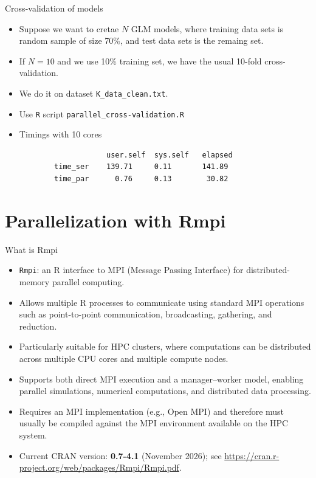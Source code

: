 \documentclass[compress,xcolor=table]{beamer}
\begin{document}
\begin{frame}[fragile]{Cross-validation of models}
\begin{itemize}
	\item 	Suppose we want to cretae $N$ GLM models, where training data sets is random sample of size 70\%, and test data sets is the remaing set. 
	\item If $N=10$ and we use 10\% training set, we have the usual 10-fold cross-validation.
	\item We do it on dataset {\tt K\_data\_clean.txt}.
	\item Use {\tt R} script {\tt parallel\_cross-validation.R}
	\item Timings with 10 cores
		\begin{verbatim}
		            user.self  sys.self   elapsed
        time_ser    139.71     0.11       141.89    
        time_par      0.76     0.13        30.82    
 \end{verbatim}
\end{itemize}
\end{frame}

%

	
	
\section{Parallelization with Rmpi}
%




	
	\begin{frame}[fragile]{What  is Rmpi}
\begin{itemize} \footnotesize
	\item \texttt{Rmpi}: an R interface to MPI (Message Passing Interface) for distributed-memory parallel computing. 
	\item Allows multiple R processes to communicate using standard MPI operations such as point-to-point communication, broadcasting, gathering, and reduction. \item Particularly suitable for HPC clusters, where computations can be distributed across multiple CPU cores and multiple compute nodes. 
	\item Supports both direct MPI execution and a manager--worker model, enabling parallel simulations, numerical computations, and distributed data processing. \item Requires an MPI implementation (e.g., Open MPI) and therefore must usually be compiled against the MPI environment available on the HPC system. 
	\item Current CRAN version: \textbf{0.7-4.1} (November 2026); see \url{https://cran.r-project.org/web/packages/Rmpi/Rmpi.pdf}. 
\end{itemize}
	\end{frame}
	
\end{document}
